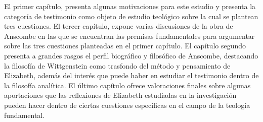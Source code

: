 El primer capítulo, presenta algunas motivaciones para este estudio y presenta la categoría de testimonio como objeto de estudio teológico sobre la cual se plantean tres cuestiones. El tercer capítulo, expone varias discusiones de la obra de Anscombe en las que se encuentran las premisas fundamentales para argumentar sobre las tres cuestiones planteadas en el primer capítulo. El capítulo segundo presenta a grandes rasgos el perfil biográfico y filosófico de Anscombe, destacando la filosofía de Wittgenstein como trasfondo del método y pensamiento de Elizabeth, además del interés que puede haber en estudiar el testimonio dentro de la filosofía analítica. El último capítulo ofrece valoraciones finales sobre algunas aportaciones que las reflexiones de Elizabeth estudiadas en la investigación pueden hacer dentro de ciertas cuestiones específicas en el campo de la teología fundamental.

